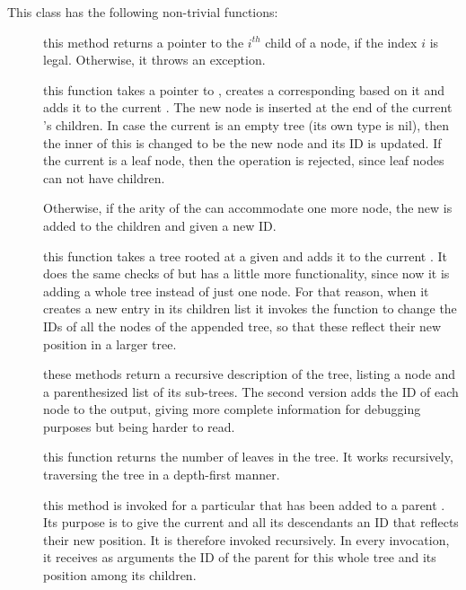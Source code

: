 \documentclass{article}
\begin{document}
This class has the following non-trivial functions:
\begin{description}
\item[] this method returns a pointer to the $i^{th}$ child of a node, if the index $i$ is legal. Otherwise, it throws an exception.

\item[] this function takes a pointer to \cnode, creates a corresponding \ctree based on it and adds it to the current \ctree. The new node is inserted at the end of the current \ctree's children. In case the current \ctree is an empty tree (its own type is nil), then the inner \cnode of this \ctree is changed to be the new node and its ID is updated. If the current \ctree is a leaf node, then the operation is rejected, since leaf nodes can not have children. 

Otherwise, if the arity of the \ctree can accommodate one more node, the new \ctree is added to the children and given a new ID.
\item[] this function takes a tree rooted at a given \ctree and adds it to the current \ctree. It does the same checks of  but has a little more functionality, since now it is adding a whole tree instead of just one node. For that reason, when it creates a new entry in its children list it invokes the function  to change the IDs of all the nodes of the appended tree, so that these reflect their new position in a larger tree.

\item[] these methods return a recursive description of the tree, listing a node and a parenthesized list of its sub-trees. The second version adds the ID of each node to the output, giving more complete information for debugging purposes but being harder to read.

\item[] this function returns the number of leaves in the tree. It works recursively, traversing the tree in a depth-first manner.
\item[] this method is invoked for a particular \ctree that has been added to a parent \ctree. Its purpose is to give the current \ctree and all its descendants an ID that reflects their new position. It is therefore invoked recursively. In every invocation, it receives as arguments the ID of the parent for this whole tree and its position among its children.


\end{description}
\end{document}
